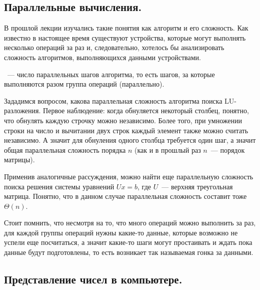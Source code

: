 \newpage
{}

\subsection{Параллельные вычисления.}

В прошлой лекции изучались такие понятия как алгоритм и его сложность. Как известно в настоящее время существуют устройства, которые
могут выполнять несколько операций за раз и, следовательно, хотелось бы анализировать сложность алгоритмов, выполняющихся данными
устройствами.

\begin{definition}
    ~--- число параллельных шагов алгоритма, то есть шагов, за которые выполняются разом группа
    операций (параллельно).
\end{definition}

\begin{exercise}
    Зададимся вопросом, какова параллельная сложность алгоритма поиска LU-разложения. Первое наблюдение: когда обнуляется некоторый столбец, понятно, что
    обнулять каждую строчку можно независимо. Более того, при умножении строки на число и вычитании двух строк каждый элемент также можно считать независимо.
    А значит для обнуления одного столбца требуется один шаг, а значит общая параллельная сложность порядка $n$ (как и в прошлый раз $n$~--- порядок матрицы).
\end{exercise}

\begin{exercise}
    Применив аналогичные рассуждения, можно найти еще параллельную сложность поиска решения системы
    уравнений $Ux=b$, где $U$~--- верхняя треугольная матрица. Понятно, что в данном случае параллельная сложность составит тоже $\Theta(n)$.
\end{exercise}

\begin{remark}
    Стоит помнить, что несмотря на то, что много операций можно выполнить за раз, для каждой группы операций нужны какие-то
    данные, которые возможно не успели еще посчитаться, а значит какие-то шаги могут простаивать и ждать пока данные будут подготовлены,
    то есть возникает так называемая гонка за данными.
\end{remark}

\subsection{Представление чисел в компьютере.}

